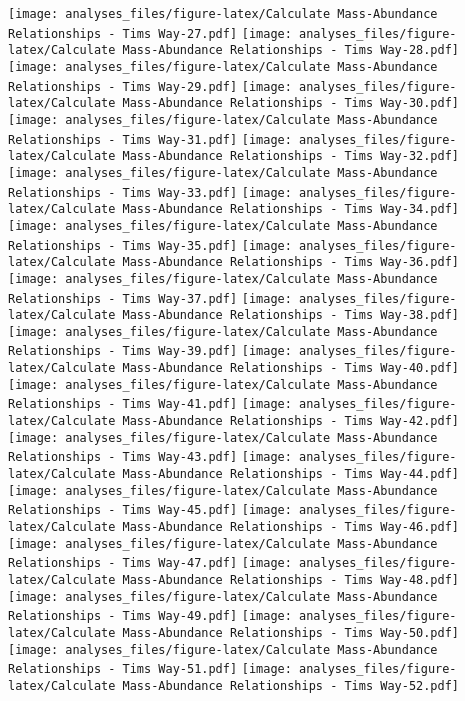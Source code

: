 \documentclass[]{article}
\begin{document}
\texttt{[image: analyses\_files/figure-latex/Calculate Mass-Abundance Relationships - Tims Way-27.pdf]}
\texttt{[image: analyses\_files/figure-latex/Calculate Mass-Abundance Relationships - Tims Way-28.pdf]}
\texttt{[image: analyses\_files/figure-latex/Calculate Mass-Abundance Relationships - Tims Way-29.pdf]}
\texttt{[image: analyses\_files/figure-latex/Calculate Mass-Abundance Relationships - Tims Way-30.pdf]}
\texttt{[image: analyses\_files/figure-latex/Calculate Mass-Abundance Relationships - Tims Way-31.pdf]}
\texttt{[image: analyses\_files/figure-latex/Calculate Mass-Abundance Relationships - Tims Way-32.pdf]}
\texttt{[image: analyses\_files/figure-latex/Calculate Mass-Abundance Relationships - Tims Way-33.pdf]}
\texttt{[image: analyses\_files/figure-latex/Calculate Mass-Abundance Relationships - Tims Way-34.pdf]}
\texttt{[image: analyses\_files/figure-latex/Calculate Mass-Abundance Relationships - Tims Way-35.pdf]}
\texttt{[image: analyses\_files/figure-latex/Calculate Mass-Abundance Relationships - Tims Way-36.pdf]}
\texttt{[image: analyses\_files/figure-latex/Calculate Mass-Abundance Relationships - Tims Way-37.pdf]}
\texttt{[image: analyses\_files/figure-latex/Calculate Mass-Abundance Relationships - Tims Way-38.pdf]}
\texttt{[image: analyses\_files/figure-latex/Calculate Mass-Abundance Relationships - Tims Way-39.pdf]}
\texttt{[image: analyses\_files/figure-latex/Calculate Mass-Abundance Relationships - Tims Way-40.pdf]}
\texttt{[image: analyses\_files/figure-latex/Calculate Mass-Abundance Relationships - Tims Way-41.pdf]}
\texttt{[image: analyses\_files/figure-latex/Calculate Mass-Abundance Relationships - Tims Way-42.pdf]}
\texttt{[image: analyses\_files/figure-latex/Calculate Mass-Abundance Relationships - Tims Way-43.pdf]}
\texttt{[image: analyses\_files/figure-latex/Calculate Mass-Abundance Relationships - Tims Way-44.pdf]}
\texttt{[image: analyses\_files/figure-latex/Calculate Mass-Abundance Relationships - Tims Way-45.pdf]}
\texttt{[image: analyses\_files/figure-latex/Calculate Mass-Abundance Relationships - Tims Way-46.pdf]}
\texttt{[image: analyses\_files/figure-latex/Calculate Mass-Abundance Relationships - Tims Way-47.pdf]}
\texttt{[image: analyses\_files/figure-latex/Calculate Mass-Abundance Relationships - Tims Way-48.pdf]}
\texttt{[image: analyses\_files/figure-latex/Calculate Mass-Abundance Relationships - Tims Way-49.pdf]}
\texttt{[image: analyses\_files/figure-latex/Calculate Mass-Abundance Relationships - Tims Way-50.pdf]}
\texttt{[image: analyses\_files/figure-latex/Calculate Mass-Abundance Relationships - Tims Way-51.pdf]}
\texttt{[image: analyses\_files/figure-latex/Calculate Mass-Abundance Relationships - Tims Way-52.pdf]}
\end{document}
